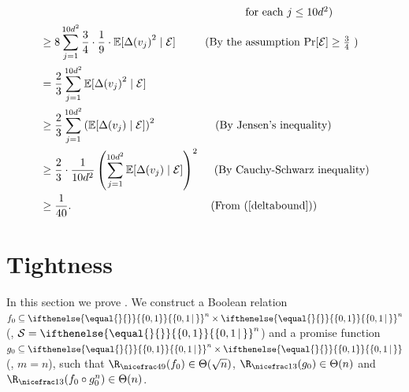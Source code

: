 \documentclass{toc}
\newcommand{\md}{\middle}
\newcommand{\dr}{\nicefrac}
\newcommand{\sq}{\sqrt}
\newcommand{\set}[2][]{\ifthenelse{\equal{}{#1}}%
{\ensuremath{\left\{#2\right\}}}%
{\ensuremath{\left\{#2\,\md|\,#1\right\}}}}
\newcommand{\asT}[1]{\Theta(#1)}
\newcommand{\OI}{\set{0,1}}
\newcommand{\sbseq}{\subseteq}
\newcommand{\clE}{\mathcal{E}}
\newcommand{\E}{\mathbb{E}}
\begin{document}
\begin{align}
&\mbox{\ \ \ \ \ \ \ \ \ \ \ \ \ \ \ \ \ \ \ \ \  \ \ \ \ \ \ \ \ \ \ \ \ \ \ \ \ \ \ \ \ \ \  \  \ \ \ \ \ \ \ \ \ \ \ \ for each $j \leq 10d^2$)} \nonumber \\
&\geq 8 \sum_{j=1}^{10d^2} \frac{3}{4} \cdot \frac{1}{9} \cdot \E[{\Delta(v_j)}^2 \mid \clE] \mbox{\ \ \ \ \ \  \ \  (By the assumption $\Pr[\clE] \geq \frac{3}{4}$ )} \nonumber \\
&= \frac{2}{3}\sum_{j=1}^{10d^2}   \E[{\Delta(v_j)}^2 \mid \clE]  \nonumber \\
&\geq \frac{2}{3}\sum_{j=1}^{10d^2}   \left(\E[{\Delta(v_j)} \mid \clE]\right)^2 \mbox{\ \ \ \ \ \ \ \ \ \ \ \ \ \ \ \ (By Jensen's inequality)} \nonumber \\
&\geq \frac{2}{3} \cdot \frac{1}{10d^2} \left(\sum_{j=1}^{10d^2}  \E[\Delta(v_j) \mid \clE]\right)^2 \mbox{\ \ \ \ (By Cauchy-Schwarz inequality)} \nonumber \\
&\geq \frac{1}{40}.\mbox{\ \ \ \ \ \ \ \ \ \ \ \ \ \ \ \ \ \ \ \ \ \ \ \ \ \ \ \ \ \ \ \ \ \ \  \ \ \ (From~(\ref{deltabound}))}\label{infbound}
\end{align}


%
%


\section{Tightness}


In this section we prove . We construct a
Boolean  %
relation $f_0\sbseq\OI^n\times\OI^n$ (\ie, $\mathcal{S}=\OI^n$) and a promise function $g_0 \subseteq \OI^n\times\set{0,1}$ (\ie, $m=n$), such that $\R_{\dr49}(f_0)\in\asT{\sq n}$, $\R_{\dr13}(g_0)\in\asT{n}$ and $\R_{\dr13}(f_0\circ g_0^n)\in\asT{n}$.
\end{document}
